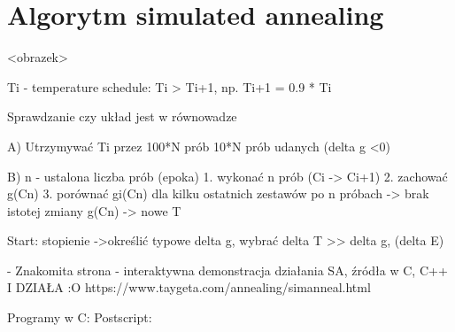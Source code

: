 \section{Algorytm simulated annealing}

<obrazek>

Ti - temperature schedule: Ti > Ti+1, np. Ti+1 = 0.9 * Ti

Sprawdzanie czy układ jest w równowadze

A)
Utrzymywać Ti przez 
100*N prób
10*N prób udanych (delta g <0)

B)
n - ustalona liczba prób (epoka)
1. wykonać n prób (Ci -> Ci+1)
2. zachować g(Cn)
3. porównać gi(Cn) dla kilku ostatnich zestawów po n próbach -> brak istotej zmiany g(Cn) -> nowe T

Start:
stopienie ->określić typowe delta g, wybrać delta T >> delta g, (delta E)

- Znakomita strona - interaktywna demonstracja działania SA, źródła w C, C++
I DZIAŁA :O
https://www.taygeta.com/annealing/simanneal.html

Programy w C:
Postscript:
